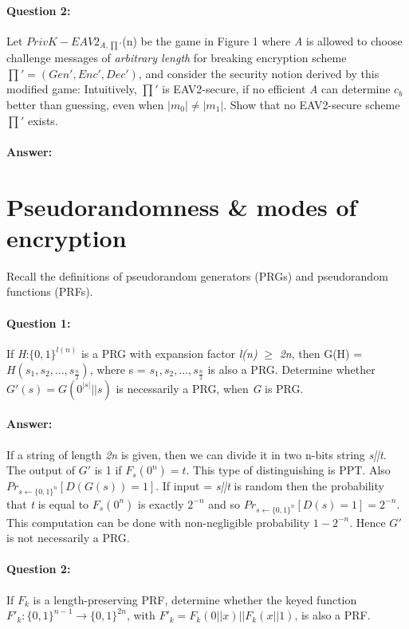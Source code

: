 \documentclass{article}
\begin{document}
    \paragraph{Question 2:} Let $PrivK-EAV2_{A,\prod'}$(n) be the game in Figure 1 where \emph{A} is allowed to choose challenge messages of \emph{arbitrary length} for breaking encryption scheme $\prod' = (Gen',Enc',Dec')$, and consider the security notion derived by this modified game: Intuitively, $\prod'$ is EAV2-secure, if no efficient \emph{A} can determine $c_b$ better than guessing, even when $|m_0| \neq |m_1|$. Show that no EAV2-secure scheme $\prod'$ exists.
    \paragraph{Answer: \newline}
    
\section{Pseudorandomness \& modes of encryption}
    Recall the definitions of pseudorandom generators (PRGs) and pseudorandom functions (PRFs).
    
    \paragraph{Question 1:} If \emph{H}:$\{0,1\}^{l(n)}$ is a PRG with expansion factor \emph{l(n)} $\geq$ \emph{2n}, then G(H) = $H(s_1,s_2,..., s_{\frac{n}{2}})$, where s = $s_1,s_2,..., s_{\frac{n}{2}}$ is also a PRG. Determine whether $G\prime(s)=G(0^{|s|}||s)$ is necessarily a PRG, when \emph{G} is PRG.
    
    \paragraph{Answer: \newline}
    If a string of length \emph{2n} is given, then we can divide it in two n-bits string \emph{s||t}. The output of $G\prime$ is 1 if ${F_s}(0^n) = t$. This type of distinguishing is PPT. Also $Pr_{s\leftarrow{\{0,1\}^n}}[D(G(s)) = 1]$. If input = \emph{s||t} is random then the probability that \emph{t} is equal to $F_s{(0^n)}$ is exactly $2^{-n}$ and so $Pr_{s\leftarrow{\{0,1\}^n}}[D(s) = 1] = 2^{-n}$. This computation can be done with non-negligible probability ${1-2^{-n}}$. Hence $G\prime$ is not necessarily a PRG.
    
    \paragraph{Question 2:} If $F_k$ is a length-preserving PRF, determine whether the keyed function ${F\prime}_k:{\{0,1\}}^{n-1}\rightarrow{\{0,1\}}^{2n}$, with ${F\prime}_k=F_k(0||x)||F_k(x||1)$, is also a PRF.
\end{document}
